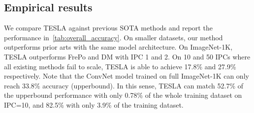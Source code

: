 \documentclass[10pt,twocolumn,letterpaper]{article}
\begin{document}
\subsection{Empirical results}
We compare TESLA against previous SOTA methods and report the performance in~\cref{tab:overall_accuracy}.
On smaller datasets, our method outperforms prior arts with the same model architecture.
On ImageNet-1K, TESLA outperforms FrePo and DM with IPC 1 and 2. On 10 and 50 IPCs where all existing methods fail to scale, TESLA is able to achieve 17.8\% and 27.9\% respectively.
Note that the ConvNet model trained on full ImageNet-1K can only reach 33.8\% accuracy (upperbound).
In this sense, TESLA can match 52.7\% of the upperbound performance with only 0.78\% of the whole training dataset on IPC=10, and 82.5\% with only 3.9\% of the training dataset.
\end{document}
